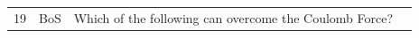 \documentclass[10pt]{article}
\begin{document}
\begin{tiny}
\begin{longtable}{r p{0.3in} p{1.212in} p{3.8in}}
    19 &          BoS &                                                                                                                                                                                                                           Which of the following can overcome the Coulomb Force? &                                                                                                                                                                                                                                                                                                                                                                                                                                                                                                                                                                                                                                                                                                                                                                                                                                                                                                                                                                                                                                                                                                                                                                                                                                                                                                                                                                                                                                                                                                                                                                                                                                                                                                                                                                                                                                                                                                                                                                                                                                                                                                                                                                                                                                                                                                                                                                                                                                                                                                                                                                                                                                                                                                                                                                                                                                                                                                                                                                                                                                                                                               
\end{longtable}
\end{tiny}
\end{document}
